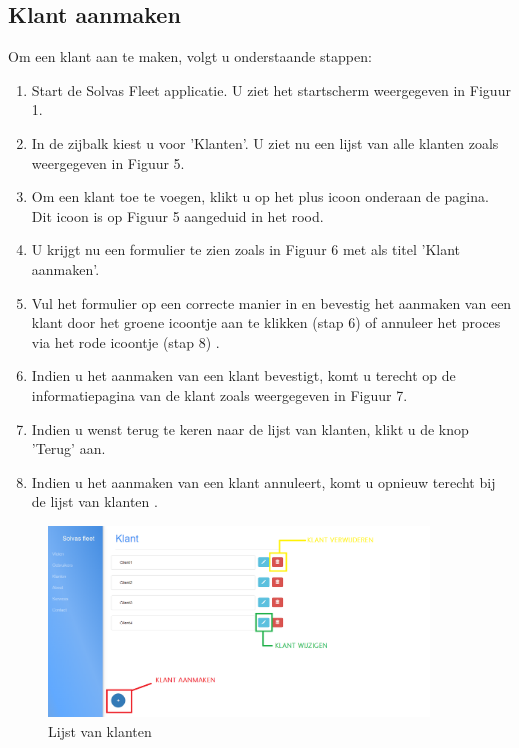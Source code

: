 \documentclass[11pt,openany]{article}
\begin{document}
\subsection{Klant aanmaken}
Om een klant aan te maken, volgt u onderstaande stappen:
\begin{enumerate}
	\item Start de Solvas Fleet applicatie. U ziet het startscherm weergegeven in Figuur 1.
	\item In de zijbalk kiest u voor 'Klanten'. U ziet nu een lijst van alle klanten zoals weergegeven in Figuur 5.
	\item Om een klant toe te voegen, klikt u op het plus icoon onderaan de pagina. Dit icoon is op Figuur 5 aangeduid in het rood.
	\item U krijgt nu een formulier te zien zoals in Figuur 6 met als titel 'Klant aanmaken'.
	\item Vul het formulier op een correcte manier in en bevestig het aanmaken van een klant door het groene icoontje aan te klikken (stap 6) of annuleer het proces via het rode icoontje (stap 8) .
	\item Indien u het aanmaken van een klant bevestigt, komt u terecht op de informatiepagina van de klant zoals weergegeven in Figuur 7. 
	\item Indien u wenst terug te keren  naar de lijst van klanten, klikt u de knop 'Terug' aan.
	\item Indien u het aanmaken van een klant annuleert, komt u opnieuw terecht bij de lijst van klanten .
\end{enumerate}
\begin{figure}
	\centering
	\includegraphics[width=0.9\textwidth]{fig5.png}
	\caption{Lijst van klanten}
\end{figure}
\end{document}
